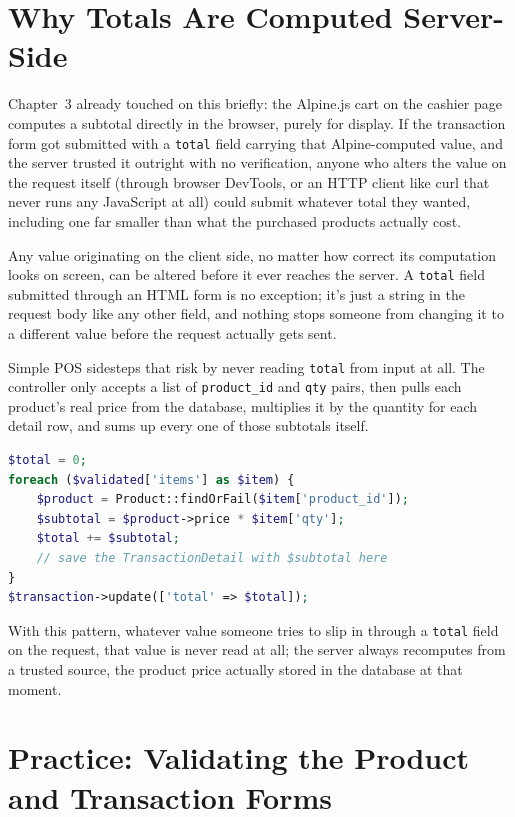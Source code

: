 \section{Why Totals Are Computed Server-Side}
\label{sec:validasi-input-2}

Chapter~3 already touched on this briefly: the Alpine.js cart on the
cashier page computes a subtotal directly in the browser, purely for
display. If the transaction form got submitted with a \texttt{total}
field carrying that Alpine-computed value, and the server trusted it
outright with no verification, anyone who alters the value on the
request itself (through browser DevTools, or an HTTP client like curl
that never runs any JavaScript at all) could submit whatever total they
wanted, including one far smaller than what the purchased products
actually cost.

\begin{warningbox}
Any value originating on the client side, no matter how correct its
computation looks on screen, can be altered before it ever reaches the
server. A \texttt{total} field submitted through an HTML form is no
exception; it's just a string in the request body like any other field,
and nothing stops someone from changing it to a different value before
the request actually gets sent.
\end{warningbox}

Simple POS sidesteps that risk by never reading \texttt{total} from
input at all. The controller only accepts a list of
\texttt{product\_id} and \texttt{qty} pairs, then pulls each product's
real price from the database, multiplies it by the quantity for each
detail row, and sums up every one of those subtotals itself.

\begin{lstlisting}[language=php]
$total = 0;
foreach ($validated['items'] as $item) {
    $product = Product::findOrFail($item['product_id']);
    $subtotal = $product->price * $item['qty'];
    $total += $subtotal;
    // save the TransactionDetail with $subtotal here
}
$transaction->update(['total' => $total]);
\end{lstlisting}

With this pattern, whatever value someone tries to slip in through a
\texttt{total} field on the request, that value is never read at all;
the server always recomputes from a trusted source, the product price
actually stored in the database at that moment.

\section{Practice: Validating the Product and Transaction Forms}
\label{sec:validasi-input-3}

